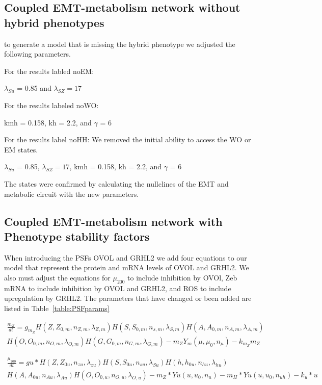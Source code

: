 \documentclass{article}
\begin{document}
\FloatBarrier
\subsection{Coupled EMT-metabolism network without hybrid phenotypes}
to generate a model that is missing the hybrid phenotype we adjusted the following parameters. 

For the results labled noEM:

$\lambda_{Su}$ = 0.85 and $\lambda_{SZ} = 17$

\vspace{0.5cm}
For the results labeled noWO:

kmh = 0.158, kh = 2.2, and $\gamma$ = 6

\vspace{0.5cm}

For the results label noHH:
We removed the initial ability to access the WO or EM states.

$\lambda_{Su}$ = 0.85, $\lambda_{SZ} = 17$, kmh = 0.158, kh = 2.2, and $\gamma$ = 6

The states were confirmed by calculating the nullclines of the EMT and metabolic circuit with the new parameters.

\subsection{Coupled EMT-metabolism network with Phenotype stability factors}

When introducing the PSFs OVOL and GRHL2  we add four equations to our model that represent the protein and mRNA levels of OVOL and GRHL2.   
We also must adjust the equations for $\mu_{200}$ to include inhibition by OVOl, Zeb mRNA to include inhibition by OVOL and GRHL2,  and ROS to include upregulation by GRHL2. 
The parameters that have changed or been added are listed in Table~\ref{table:PSFparams}

\begin{multline}
\frac{m_Z}{dt} = g_{m_Z} H(Z,Z_{0,m},n_{Z,m},\lambda_{Z,m}) H(S,S_{0,m},n_{s,m},\lambda_{S,m}) H(A,A_{0,m},n_{A,m},\lambda_{A,m})\\H(O,O_{0,m},n_{O,m},\lambda_{O,m})H(G,G_{0,m},n_{G,m},\lambda_{G,m}) - m_Z Y_m(\mu,\mu_0,n_\mu) - k_{m_Z} m_Z
\end{multline}

\begin{multline}
\frac{\mu_{200}}{dt}=gu*H(Z,Z_{0u},n_{zu}, \lambda_{zu}) H(S,S_{0u},n_{su},\lambda_{Su}) H(h,h_{0u},n_{hu},\lambda_{hu})\\ H(A,A_{0u},n_{Au},\lambda_{Au})H(O,O_{0,u},n_{O,u},\lambda_{O,u})-m_Z*Yu(u,u_0,n_u)-m_H*Yu(u,u_0,n_{uh})-k_u*u
\end{multline}
\end{document}
